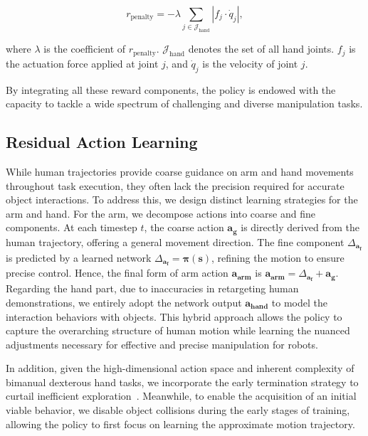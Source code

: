 \begin{equation}
r_{\text{penalty}} = -\lambda \sum_{j \in \mathcal{J}_{\text{hand}}} \left| f_j \cdot \dot{q}_j \right|,
\end{equation}

where $\lambda$ is the coefficient of $r_{\text{penalty}}$. $\mathcal{J}_{\text{hand}}$ denotes the set of all hand joints. $f_{j}$ is the actuation force applied at joint $j$, and $\dot{q}_j$ is the velocity of joint $j$. 


By integrating all these reward components, the policy is endowed with the capacity to tackle a wide spectrum of challenging and diverse manipulation tasks.


\subsection{Residual Action Learning}
 While human trajectories provide coarse guidance on arm and hand movements throughout task execution, they often lack the precision required for accurate object interactions. To address this, we design distinct learning strategies for the arm and hand. For the arm, we decompose actions into coarse and fine components. At each timestep $t$,  the coarse action $\boldsymbol{a_{g}}$ is directly derived from the human trajectory, offering a general movement direction. The fine component $\Delta_{\boldsymbol{a_{f}}}$ is predicted by a learned network $\Delta_{\boldsymbol{a_{f}}}=\boldsymbol{\pi(s)}$, refining the motion to ensure precise control. Hence, the final form of arm action $\boldsymbol{a_{arm}}$ is $\boldsymbol{a_{arm}}=\Delta_{\boldsymbol{a_{f}}}+\boldsymbol{a_{g}}$. Regarding the hand part, due to inaccuracies in retargeting human demonstrations, we entirely adopt the network output $\boldsymbol{a_{hand}}$  to model the interaction behaviors with objects. This hybrid approach allows the policy to capture the overarching structure of human motion while learning the nuanced adjustments necessary for effective and precise manipulation for robots. 

In addition, given the high-dimensional action space and inherent complexity of bimanual dexterous hand tasks, we incorporate the early termination strategy to curtail inefficient exploration~\cite{peng2018deepmimic}. Meanwhile, to enable the acquisition of an initial viable behavior, we disable object collisions during the early stages of training, allowing the policy to first focus on learning the approximate motion trajectory.


